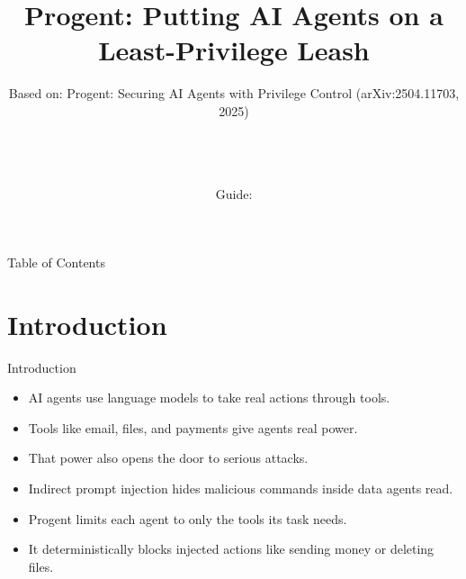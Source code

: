 \documentclass[10pt]{beamer}
\title[B.Tech Seminar]{Progent: Putting AI Agents on a Least-Privilege Leash}
\subtitle{Based on: Progent: Securing AI Agents with Privilege Control (arXiv:2504.11703, 2025)}
\author[\studentname\ (\shortinst)]{\studentname \\ \small \rollno \\ \small \rollclass \\ \small Guide: \guidename}
\institute[]{\deptname \\ \collegename}
\date{\seminardate}
\begin{document}
\begin{frame}[plain]
  \titlepage
\end{frame}
\begin{frame}{Table of Contents}
  \tableofcontents
\end{frame}
\section{Introduction}
\begin{frame}{Introduction}
\begin{itemize}
  \item AI agents use language models to take real actions through tools.
  \item Tools like email, files, and payments give agents real power.
  \item That power also opens the door to serious attacks.
  \item Indirect prompt injection hides malicious commands inside data agents read.
  \item Progent limits each agent to only the tools its task needs.
  \item It deterministically blocks injected actions like sending money or deleting files.
\end{itemize}
\end{frame}
\end{document}
